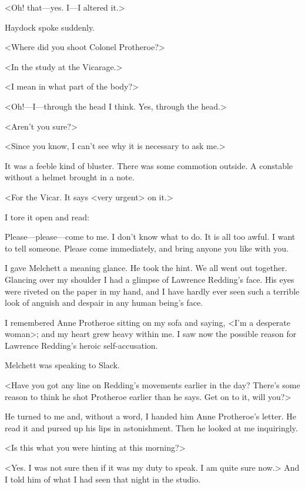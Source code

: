 <Oh! that—yes. I—I altered it.>

Haydock spoke suddenly.

<Where did you shoot Colonel Protheroe?>

<In the study at the Vicarage.>

<I mean in what part of the body?>

<Oh!—I—through the head I think. Yes, through the head.>

<Aren't you sure?>

<Since you know, I can't see why it is necessary to ask me.>

It was a feeble kind of bluster. There was some commotion outside. A constable without a helmet brought in a note.

<For the Vicar. It says <very urgent> on it.>

I tore it open and read:

\begin{mail}{}{}

Please—please—come to me. I don't know what to do. It is all too awful. I want to tell someone. Please come immediately, and bring anyone you like with you.

\end{mail}

I gave Melchett a meaning glance. He took the hint. We all went out together. Glancing over my shoulder I had a glimpse of Lawrence Redding's face. His eyes were riveted on the paper in my hand, and I have hardly ever seen such a terrible look of anguish and despair in any human being's face.

I remembered Anne Protheroe sitting on my sofa and saying, <I'm a desperate woman>; and my heart grew heavy within me. I saw now the possible reason for Lawrence Redding's heroic self-accusation.

Melchett was speaking to Slack.

<Have you got any line on Redding's movements earlier in the day? There's some reason to think he shot Protheroe earlier than he says. Get on to it, will you?>

He turned to me and, without a word, I handed him Anne Protheroe's letter. He read it and pursed up his lips in astonishment. Then he looked at me inquiringly.

<Is this what you were hinting at this morning?>

<Yes. I was not sure then if it was my duty to speak. I am quite sure now.> And I told him of what I had seen that night in the studio.

